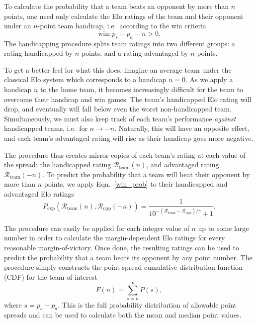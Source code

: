 \documentclass[aps,prc,reprint,amsmath,superscriptaddress]{revtex4-1}
\newcommand{\R}{\mathcal{R}}
\begin{document}
To calculate the probability that a team beats an opponent by more than $n$ points, one need only calculate the Elo ratings of the team and their opponent under an $n$-point team handicap, i.e.\ according to the win criteria
\begin{equation}
  \text{win}: p_s - p_a - n > 0.
\end{equation}
The handicapping procedure splits team ratings into two different groups: a rating handicapped by $n$ points, and a rating advantaged by $n$ points.

To get a better feel for what this does, imagine an average team under the classical Elo system which corresponds to a handicap $n=0$. 
As we apply a handicap $n$ to the home team, it becomes increasingly difficult for the team to overcome their handicap and win games.
The team's handicapped Elo rating will drop, and eventually will fall below even the worst non-handicapped team.
Simultaneously, we must also keep track of each team's performance \emph{against} handicapped teams, i.e.\ for $n \rightarrow -n$.
Naturally, this will have an opposite effect, and each team's advantaged rating will rise as their handicap goes more negative.

The procedure thus creates mirror copies of each team's rating at each value of the spread: the handicapped rating $\R_\text{team}(n)$, and advantaged rating $\R_\text{team}(-n)$.
To predict the probability that a team will beat their opponent by more than $n$ points, we apply Eqn.~\eqref{win_prob} to their handicapped and advantaged Elo ratings
\begin{equation}
  \label{win_prob_hcap}
  P_\text{exp}(\R_\text{team}(n), \R_\text{opp}(-n)) = \frac{1}{10^{-(\R_\text{team} - \R_\text{opp})/\gamma} + 1}.
\end{equation}

The procedure can easily be applied for each integer value of $n$ up to some large number in order to calculate the margin-dependent Elo ratings for every reasonable margin-of-victory.
Once done, the resulting ratings can be used to predict the probability that a team beats its opponent by any point number.
The procedure simply constructs the point spread cumulative distribution function (CDF) for the team of interest
\begin{equation}
  \label{cdf}
  F(n) = \sum_{s=n}^\infty P(s),
\end{equation}
where $s = p_s - p_a$.
This is the full probability distribution of allowable point spreads and can be used to calculate both the mean and median point values.
\end{document}
